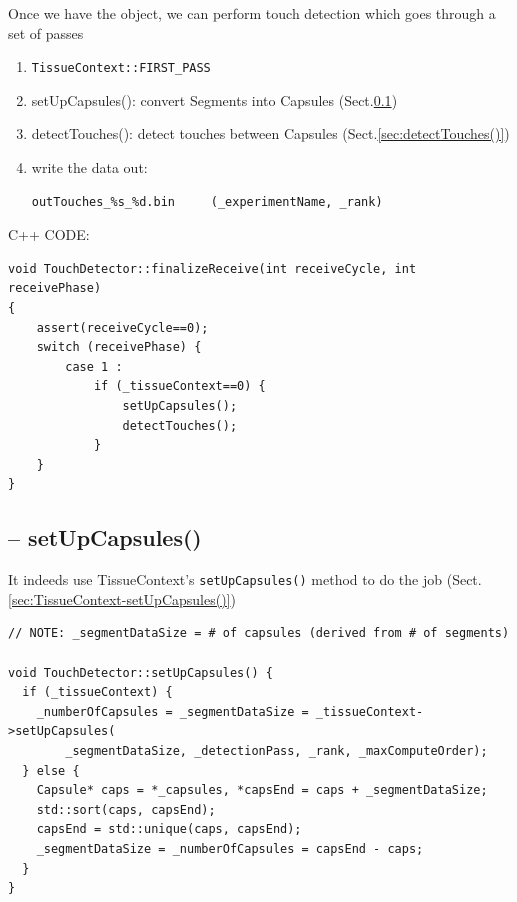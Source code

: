 Once we have the object, we can perform touch detection
which goes through a set of passes
\begin{enumerate}
  \item \verb!TissueContext::FIRST_PASS!
  
  \item setUpCapsules(): convert Segments into Capsules (Sect.\ref{sec:setUpCapsules()})
  
  \item detectTouches(): detect touches between Capsules (Sect.\ref{sec:detectTouches()}) 

  \item write the data out:
  
\begin{verbatim}
outTouches_%s_%d.bin     (_experimentName, _rank)
\end{verbatim}
  
\end{enumerate}


C++ CODE:
\begin{lstlisting}
void TouchDetector::finalizeReceive(int receiveCycle, int receivePhase)
{
	assert(receiveCycle==0);
	switch (receivePhase) {
		case 1 :
			if (_tissueContext==0) {
				setUpCapsules();
				detectTouches();
			}
	}
}

\end{lstlisting}

\subsection{-- setUpCapsules()}
\label{sec:setUpCapsules()}

It indeeds use TissueContext's \verb!setUpCapsules()! method to do the job
(Sect.\ref{sec:TissueContext-setUpCapsules()})

\begin{verbatim}
// NOTE: _segmentDataSize = # of capsules (derived from # of segments)

void TouchDetector::setUpCapsules() {
  if (_tissueContext) {
    _numberOfCapsules = _segmentDataSize = _tissueContext->setUpCapsules(
        _segmentDataSize, _detectionPass, _rank, _maxComputeOrder);
  } else {
    Capsule* caps = *_capsules, *capsEnd = caps + _segmentDataSize;
    std::sort(caps, capsEnd);
    capsEnd = std::unique(caps, capsEnd);
    _segmentDataSize = _numberOfCapsules = capsEnd - caps;
  }
}
\end{verbatim}



